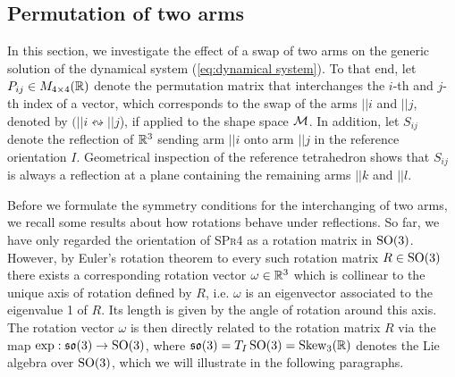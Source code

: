 \subsection{Permutation of two arms}
In this section, we investigate the effect of a swap of two arms on the generic solution of the dynamical system (\ref{eq:dynamical system}).
To that end, let $P_{ij} \in M_{4 \times 4}(\mathbb{R})$ denote the permutation matrix that interchanges the $i$-th and $j$-th index of a vector, which corresponds to the swap of the arms $||i$ and $||j$, denoted by $(||i\leftrightsquigarrow ||j$), if applied to the shape space $\mathcal{M}$. In addition, let $S_{ij}$ denote the reflection of $\mathbb{R}^3$ sending arm $||i$ onto arm $||j$ in the reference orientation $I$. Geometrical inspection of the reference tetrahedron shows that $S_{ij}$ is always a reflection at a plane containing the remaining arms $||k$ and $||l$.

Before we formulate the symmetry conditions for the interchanging of two arms, we recall some results about how rotations behave under reflections. So far, we have only regarded the orientation of \textsc{SPr4} as a rotation matrix in $\operatorname{SO}(3)$. However, by Euler's rotation theorem to every such rotation matrix $R \in \operatorname{SO}(3)$ there exists a corresponding rotation vector $\omega \in \mathbb{R}^3$ which is collinear to the unique axis of rotation defined by $R$, i.e. $\omega$ is an eigenvector associated to the eigenvalue 1 of $R$. Its length is given by the angle of rotation around this axis. The rotation vector $\omega$ is then directly related to the rotation matrix $R$ via the map $\exp: \mathfrak{so}(3) \to \operatorname{SO}(3)$, where $\mathfrak{so}(3) = T_I \operatorname{SO}(3) = \operatorname{Skew}_3(\mathbb{R})$ denotes the Lie algebra over $\operatorname{SO}(3)$, which we will illustrate in the following paragraphs.


